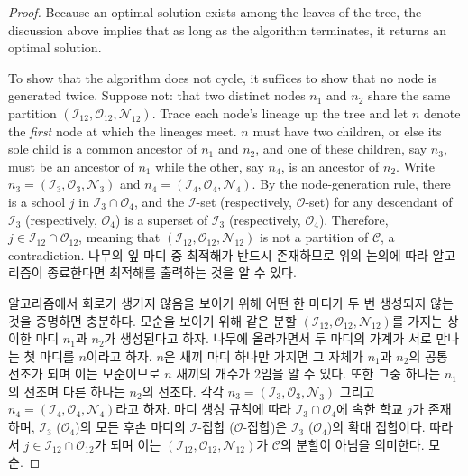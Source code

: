 \documentclass[11pt]{article} %
\theoremstyle{definition}
\theoremstyle{definition}
\begin{document}
\begin{proof}
\ifen
Because an optimal solution exists among the leaves of the tree, the discussion above implies that as long as the algorithm terminates, it returns an optimal solution.

To show that the algorithm does not cycle, it suffices to show that no node is generated twice. Suppose not: that two distinct nodes $n_1$ and $n_2$ share the same partition $(\mathcal{I}_{12}, \mathcal{O}_{12}, \mathcal{N}_{12})$. Trace each node's lineage up the tree and let $n$ denote the \emph{first} node at which the lineages meet. $n$ must have two children, or else its sole child is a common ancestor of $n_1$ and $n_2$, and one of these children, say $n_3$, must be an ancestor of $n_1$ while the other, say $n_4$, is an ancestor of $n_2$.  Write $n_3 = (\mathcal{I}_{3}, \mathcal{O}_{3}, \mathcal{N}_{3})$ and $n_4 = (\mathcal{I}_{4}, \mathcal{O}_{4}, \mathcal{N}_{4})$. By the node-generation rule, there is a school $j$ in $\mathcal{I}_3 \cap \mathcal{O}_4$, and the $\mathcal{I}$-set (respectively, $\mathcal{O}$-set) for any descendant of $\mathcal{I}_3$ (respectively, $\mathcal{O}_4$) is a superset of  $\mathcal{I}_3$ (respectively, $\mathcal{O}_4$). Therefore, $j \in \mathcal{I}_{12} \cap \mathcal{O}_{12}$, meaning that $(\mathcal{I}_{12}, \mathcal{O}_{12}, \mathcal{N}_{12})$ is not a partition of $\mathcal{C}$, a contradiction. 
\else
나무의 잎 마디 중 최적해가 반드시 존재하므로 위의 논의에 따라 알고리즘이 종료한다면 최적해를 출력하는 것을 알 수 있다.

알고리즘에서 회로가 생기지 않음을 보이기 위해 어떤 한 마디가 두 번 생성되지 않는 것을 증명하면 충분하다. 모순을 보이기 위해 같은 분할 $(\mathcal{I}_{12}, \mathcal{O}_{12}, \mathcal{N}_{12})$를 가지는 상이한 마디 $n_1$과 $n_2$가 생성된다고 하자. 나무에 올라가면서 두 마디의 가계가 서로 만나는 첫 마디를 $n$이라고 하자. $n$은 새끼 마디 하나만 가지면 그 자체가  $n_1$과 $n_2$의 공통 선조가 되며 이는 모순이므로 $n$ 새끼의 개수가 2임을 알 수 있다. 또한 그중 하나는 $n_1$의 선조며 다른 하나는 $n_2$의 선조다. 각각 $n_3 = (\mathcal{I}_{3}, \mathcal{O}_{3}, \mathcal{N}_{3})$ 그리고 $n_4 = (\mathcal{I}_{4}, \mathcal{O}_{4}, \mathcal{N}_{4})$라고 하자. 마디 생성 규칙에 따라 $\mathcal{I}_3 \cap \mathcal{O}_4$에 속한 학교 $j$가 존재하며,  $\mathcal{I}_3$ ($\mathcal{O}_4$)의 모든 후손 마디의 $\mathcal{I}$-집합 ($\mathcal{O}$-집합)은  $\mathcal{I}_3$ ($\mathcal{O}_4$)의 확대 집합이다. 따라서 $j \in \mathcal{I}_{12} \cap \mathcal{O}_{12}$가 되며 이는 $(\mathcal{I}_{12}, \mathcal{O}_{12}, \mathcal{N}_{12})$가 $\mathcal{C}$의 분할이 아님을 의미한다. 모순. 
\fi
\end{proof}
\end{document}

